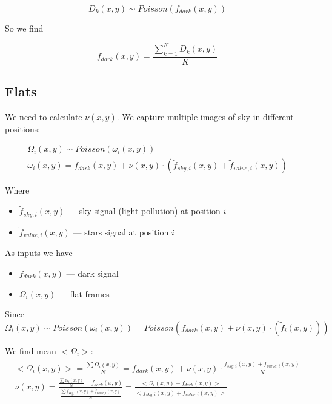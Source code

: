 \documentclass{article}
\begin{document}
\begin{equation}
    D_k(x,y) \sim Poisson(f_{dark}(x,y))
\end{equation}

So we find

\begin{equation}
    f_{dark}(x,y) = \frac{\sum_{k=1}^K D_k(x,y)}{K}
\end{equation}

\subsection{Flats}

We need to calculate $\nu(x,y)$. We capture multiple images of sky in different positions:

\begin{eqnarray}
    \Omega_i(x,y) \sim Poisson(\omega_i(x,y)) \\
    \omega_i(x,y) = f_{dark}(x,y) + \nu(x,y) \cdot \left( \tilde f_{sky, i}(x,y) + \tilde f_{value,i}(x,y) \right)
\end{eqnarray}

Where
\begin{itemize}
    \item $\tilde f_{sky, i}(x,y)$ --- sky signal (light pollution) at position $i$
    \item $\tilde f_{value, i}(x,y)$ --- stars signal at position $i$
\end{itemize}

As inputs we have
\begin{itemize}
    \item $f_{dark}(x,y)$ --- dark signal
    \item $\Omega_i(x,y)$ --- flat frames
\end{itemize}

Since 
\begin{equation}
    \Omega_i(x,y) \sim Poisson(\omega_i(x,y)) = Poisson(f_{dark}(x,y) + \nu(x,y) \cdot \left( \tilde f_i(x,y) \right))
\end{equation}

We find mean $<\Omega_i>$:
\begin{eqnarray}
    <\Omega_i(x,y)> = \frac{\sum \Omega_i(x,y)}{N} = f_{dark}(x,y) + \nu(x,y) \cdot \frac{\tilde f_{sky, i}(x,y) + \tilde f_{value,i}(x,y)}{N} \\
    \nu(x,y) = \frac{\frac{\sum \Omega_i(x,y)}{N} - f_{dark}(x,y)}{\frac{\sum \tilde f_{sky, i}(x,y) + \tilde f_{value,i}(x,y)}{N}}
    = \frac{< \Omega_i(x,y) - f_{dark}(x,y) >}{<\tilde f_{sky, i}(x,y) + \tilde f_{value,i}(x,y)>}
\end{eqnarray}
\end{document}
